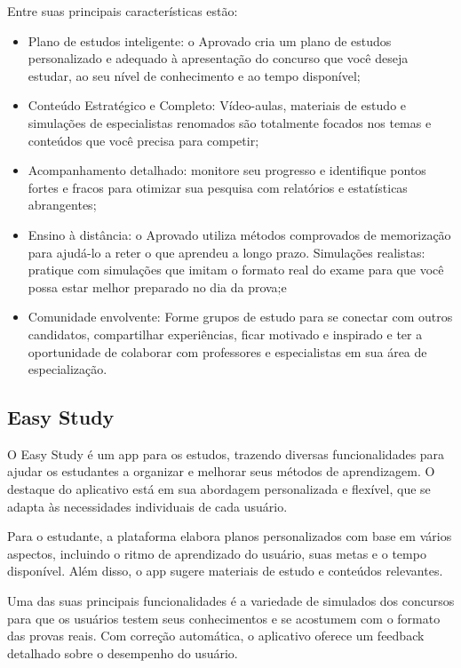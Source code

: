 Entre suas principais características estão:

\begin{itemize}
    \item Plano de estudos inteligente: o Aprovado cria um plano de estudos personalizado e adequado à apresentação do concurso que você deseja estudar, ao seu nível de conhecimento e ao tempo disponível;
    \item Conteúdo Estratégico e Completo: Vídeo-aulas, materiais de estudo e simulações de especialistas renomados são totalmente focados nos temas e conteúdos que você precisa para competir;
    \item Acompanhamento detalhado: monitore seu progresso e identifique pontos fortes e fracos para otimizar sua pesquisa com relatórios e estatísticas abrangentes;
    \item Ensino à distância: o Aprovado utiliza métodos comprovados de memorização para ajudá-lo a reter o que aprendeu a longo prazo. Simulações realistas: pratique com simulações que imitam o formato real do exame para que você possa estar melhor preparado no dia da prova;e
    \item  Comunidade envolvente: Forme grupos de estudo para se conectar com outros candidatos, compartilhar experiências, ficar motivado e inspirado e ter a oportunidade de colaborar com professores e especialistas em sua área de especialização.
\end{itemize}
 
\subsection{Easy Study}

O Easy Study é um app para os estudos, trazendo diversas funcionalidades para ajudar os estudantes a organizar e melhorar seus métodos de aprendizagem. O destaque do aplicativo está em sua abordagem personalizada e flexível, que se adapta às necessidades individuais de cada usuário.

Para o estudante, a plataforma elabora planos personalizados com base em vários aspectos, incluindo o ritmo de aprendizado do usuário, suas metas e o tempo disponível. Além disso, o app sugere materiais de estudo e conteúdos relevantes.

Uma das suas principais funcionalidades é a  variedade de simulados dos concursos para que os usuários testem seus conhecimentos e se acostumem com o formato das provas reais. Com correção automática, o aplicativo oferece um feedback detalhado sobre o desempenho do usuário.

